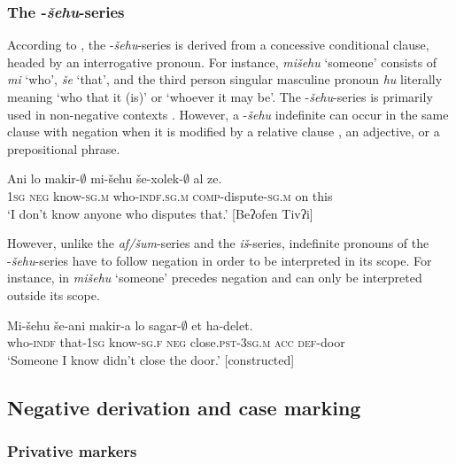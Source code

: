 \documentclass[output=paper,colorlinks,citecolor=brown]{langscibook}
\begin{document}
\subsubsection{The {}-\textit{šehu}{}-series} \label{sec:heb:3.2.3}

According to \citet[135--136]{Haspelmath1997}, the -\textit{šehu}-series is derived from a concessive conditional clause, headed by an interrogative pronoun. For instance, \textit{mišehu} ‘someone' consists of \textit{mi} ‘who', \textit{še} ‘that', and the third person singular masculine pronoun \textit{hu} literally meaning ‘who that it (is)' or ‘whoever it may be'.
The -\textit{šehu}{}-series is primarily used in non-negative contexts \citep[298--299]{Haspelmath1997}. However, a {}-\textit{šehu} indefinite can occur in the same clause with negation when it is modified by a relative clause , an adjective, or a prepositional phrase.

\ea\label{ex:heb:29}
    \gll Ani lo makir{}-${\emptyset}$ mi{}-šehu še-xolek-${\emptyset}$ al ze. \\
         \textsc{1sg} \textsc{neg} know-\textsc{sg.m} who-\textsc{indf.sg.m} \textsc{comp}{}-dispute-\textsc{sg.m} on this \\
    \glt ‘I don’t know anyone who disputes that.’ [Beʔofen Tivʔi]
\z 

However, unlike the \textit{af/šum}{}-series and the \textit{iš}{}-series, indefinite pronouns of the {}-\textit{šehu}{}-series have to follow negation in order to be interpreted in its scope. For instance, in  \textit{mišehu} ‘someone’ precedes negation and can only be interpreted outside its scope.

\ea\label{ex:heb:30}
    \gll Mi{}-šehu še-ani makir-a lo sagar-${\emptyset}$ et ha-delet. \\
        who-\textsc{indf} that-\textsc{1sg} know-\textsc{sg.f} \textsc{neg} close.\textsc{pst-3sg.m} \textsc{acc} \textsc{def}{}-door \\
    \glt ‘Someone I know didn’t close the door.’ [constructed]
\z 

\subsection{Negative derivation and case marking} \label{sec:heb:3.3}

\subsubsection{Privative markers} \label{sec:heb:3.3.1}
\end{document}
